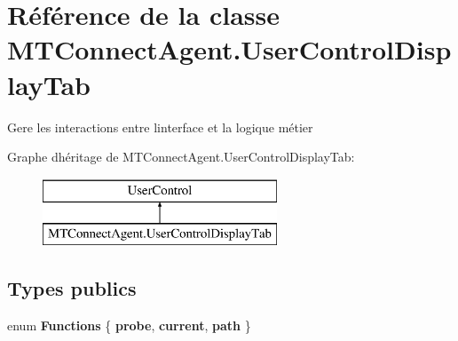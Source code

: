 \hypertarget{class_m_t_connect_agent_1_1_user_control_display_tab}{}\section{Référence de la classe M\+T\+Connect\+Agent.\+User\+Control\+Display\+Tab}
\label{class_m_t_connect_agent_1_1_user_control_display_tab}


Gere les interactions entre l\textquotesingle{}interface et la logique métier  


Graphe d\textquotesingle{}héritage de M\+T\+Connect\+Agent.\+User\+Control\+Display\+Tab\+:\begin{figure}[H]
\begin{center}
\leavevmode
\includegraphics[height=2.000000cm]{class_m_t_connect_agent_1_1_user_control_display_tab}
\end{center}
\end{figure}
\subsection*{Types publics}
\begin{DoxyCompactItemize}
\item 
\mbox{\label{class_m_t_connect_agent_1_1_user_control_display_tab_a39c6241e9b8ef40634f8340676d557ec}} 
enum {\bfseries Functions} \{ {\bfseries probe}, 
{\bfseries current}, 
{\bfseries path}
 \}
\end{DoxyCompactItemize}
